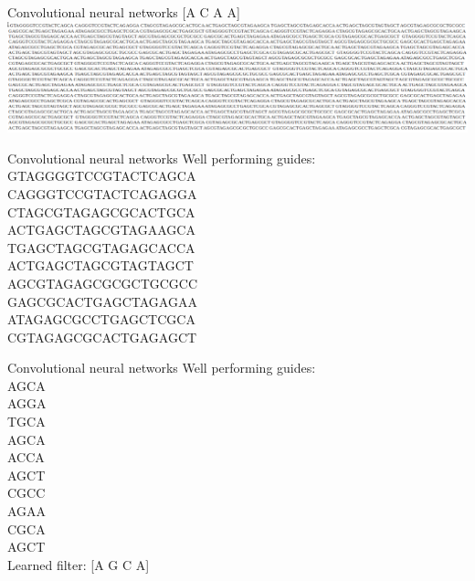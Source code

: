 \documentclass[Nike]{tuberlinbeamer}
\begin{document}
\begin{frame}{Convolutional neural networks}
  \huge[A C A A]
  \pause
  \vspace{0.7cm}
  \includegraphics[width=\textwidth]{./manyguides.png}
\end{frame}

\begin{frame}{Convolutional neural networks}
  Well performing guides: \\
  {\large
    GTAGGGGTCCGTACTCAGCA \\
    CAGGGTCCGTACTCAGAGGA \\
    CTAGCGTAGAGCGCACTGCA \\
    ACTGAGCTAGCGTAGAAGCA \\
    TGAGCTAGCGTAGAGCACCA \\
    ACTGAGCTAGCGTAGTAGCT \\
    AGCGTAGAGCGCGCTGCGCC \\
    GAGCGCACTGAGCTAGAGAA \\
    ATAGAGCGCCTGAGCTCGCA \\
    CGTAGAGCGCACTGAGAGCT \\
  }
\end{frame}

\begin{frame}{Convolutional neural networks}
  Well performing guides: \\
  {\large
    AGCA \\
    AGGA \\
    TGCA \\
    AGCA \\
    ACCA \\
    AGCT \\
    CGCC \\
    AGAA \\
    CGCA \\
    AGCT \\
  }
  \pause
  Learned filter: {[A G C A]}
\end{frame}
\end{document}
